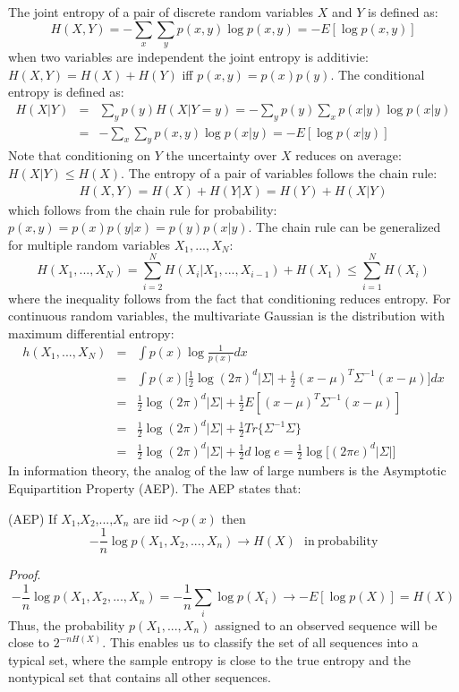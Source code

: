 The joint entropy of a pair of discrete random variables $X$ and $Y$ is defined as:
\begin{equation}
    H(X,Y) = -\sum_x \sum_y p(x,y) \log p(x,y) = -E[\log p(x,y)]
\end{equation}
when two variables are independent the joint entropy is additivie: $H(X,Y) = H(X) + H(Y)$ iff $p(x,y) = p(x)p(y)$. The conditional entropy is defined as:
\begin{eqnarray}
    H(X|Y) &=& \sum_y p(y)H(X|Y=y) = -\sum_y p(y)\sum_x p(x|y)\log p(x|y) \\
           &=& -\sum_x \sum_y p(x,y)\log p(x|y) = -E[\log p(x|y)]
\end{eqnarray}
Note that conditioning on $Y$ the uncertainty over $X$ reduces on average: $H(X|Y) \leq H(X)$. The entropy of a pair of variables follows the chain rule:
\begin{eqnarray}
    H(X,Y) = H(X) + H(Y|X) = H(Y) + H(X|Y)
\end{eqnarray}
which follows from the chain rule for probability: $p(x,y) = p(x)p(y|x) = p(y)p(x|y)$. The chain rule can be generalized for multiple random variables $X_1,...,X_N$:
\begin{equation}
    H(X_1,...,X_N) = \sum_{i=2}^{N}H(X_i|X_1,...,X_{i-1}) + H(X_1) \leq \sum_{i=1}^{N} H(X_i)
\end{equation}
where the inequality follows from the fact that conditioning reduces entropy. For continuous random variables, the multivariate Gaussian is the distribution with maximum differential entropy:
\begin{eqnarray}
    h(X_1,...,X_N) &=& \int p(x) \log \frac{1}{p(x)} dx \\
    &=& \int p(x) \bigg[\frac{1}{2}\log (2\pi)^{d}|\Sigma| + \frac{1}{2}(x-\mu)^{T}\Sigma^{-1}(x-\mu)\bigg] dx \\
    &=& \frac{1}{2}\log (2\pi)^{d}|\Sigma| + \frac{1}{2}E[(x-\mu)^{T}\Sigma^{-1}(x-\mu)] \\
    &=& \frac{1}{2}\log (2\pi)^{d}|\Sigma| + \frac{1}{2}Tr\{\Sigma^{-1}\Sigma\} \\
    &=& \frac{1}{2}\log (2\pi)^{d}|\Sigma| + \frac{1}{2}d \log e = \frac{1}{2}\log\big[(2\pi e)^d|\Sigma|\big] 
\end{eqnarray}
In information theory, the analog of the law of large numbers is the Asymptotic Equipartition Property (AEP). The AEP states that:
\begin{theorem}
(AEP) If $X_1$,$X_2$,...,$X_n$ are iid $\sim p(x)$ then
\begin{equation}
    -\frac{1}{n} \log p(X_1, X_2,...,X_n) \rightarrow H(X) ~~~\mathrm{in~probability}
\end{equation}
\end{theorem}
\textit{Proof}.
\begin{equation}
    -\frac{1}{n}\log p(X_1, X_2,...,X_n) = -\frac{1}{n}\sum_i \log p(X_i) \rightarrow -E[\log p(X)] = H(X)
\end{equation}
Thus, the probability $p(X_1,...,X_n)$ assigned to an observed sequence will be close to $2^{-nH(X)}$. This enables us to classify the set of all sequences into a typical set, where the sample entropy is close to the true entropy and the nontypical set that contains all other sequences. 

